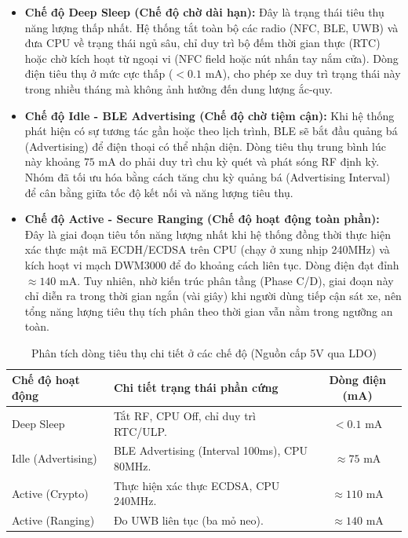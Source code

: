 \begin{itemize}
    \item \textbf{Chế độ Deep Sleep (Chế độ chờ dài hạn):} Đây là trạng thái tiêu thụ năng lượng thấp nhất. Hệ thống tắt toàn bộ các radio (NFC, BLE, UWB) và đưa CPU về trạng thái ngủ sâu, chỉ duy trì bộ đếm thời gian thực (RTC) hoặc chờ kích hoạt từ ngoại vi (NFC field hoặc nút nhấn tay nắm cửa). Dòng điện tiêu thụ ở mức cực thấp ($< 0.1$ mA), cho phép xe duy trì trạng thái này trong nhiều tháng mà không ảnh hưởng đến dung lượng ắc-quy.
    
    \item \textbf{Chế độ Idle - BLE Advertising (Chế độ chờ tiệm cận):} Khi hệ thống phát hiện có sự tương tác gần hoặc theo lịch trình, BLE sẽ bắt đầu quảng bá (Advertising) để điện thoại có thể nhận diện. Dòng tiêu thụ trung bình lúc này khoảng $75$ mA do phải duy trì chu kỳ quét và phát sóng RF định kỳ. Nhóm đã tối ưu hóa bằng cách tăng chu kỳ quảng bá (Advertising Interval) để cân bằng giữa tốc độ kết nối và năng lượng tiêu thụ.
    
    \item \textbf{Chế độ Active - Secure Ranging (Chế độ hoạt động toàn phần):} Đây là giai đoạn tiêu tốn năng lượng nhất khi hệ thống đồng thời thực hiện xác thực mật mã ECDH/ECDSA trên CPU (chạy ở xung nhịp 240MHz) và kích hoạt vi mạch DWM3000 để đo khoảng cách liên tục. Dòng điện đạt đỉnh $\approx 140$ mA. Tuy nhiên, nhờ kiến trúc phân tầng (Phase C/D), giai đoạn này chỉ diễn ra trong thời gian ngắn (vài giây) khi người dùng tiếp cận sát xe, nên tổng năng lượng tiêu thụ tích phân theo thời gian vẫn nằm trong ngưỡng an toàn.
\end{itemize}

\leavevmode
\begin{table}[H]
    \centering
    \caption{Phân tích dòng tiêu thụ chi tiết ở các chế độ (Nguồn cấp 5V qua LDO)}
    \label{tab:power_consumption}
    \begin{tabular}{|l|p{6cm}|c|}
        \hline
        \textbf{Chế độ hoạt động} & \textbf{Chi tiết trạng thái phần cứng} & \textbf{Dòng điện (mA)} \\
        \hline
        Deep Sleep & Tắt RF, CPU Off, chỉ duy trì RTC/ULP. & $< 0.1$ mA \\
        \hline
        Idle (Advertising) & BLE Advertising (Interval 100ms), CPU 80MHz. & $\approx 75$ mA \\
        \hline
        Active (Crypto) & Thực hiện xác thực ECDSA, CPU 240MHz. & $\approx 110$ mA \\
        \hline
        Active (Ranging) & Đo UWB liên tục (ba mỏ neo). & $\approx 140$ mA \\
        \hline
    \end{tabular}
\end{table}

